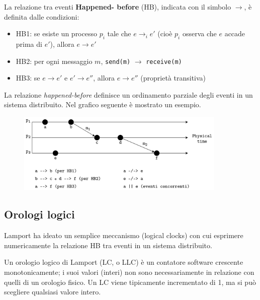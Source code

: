 \vspace{5mm}

La relazione tra eventi \textbf{Happened- before} (HB), indicata con il simbolo $\rightarrow$, è definita dalle condizioni:
\begin{itemize}
    \item HB1: se esiste un processo $ p_{i}$ tale che $e \rightarrow_{i} e'$ (cioè $p_{i}$ osserva che $e$ accade prima di $e'$), allora $e \rightarrow e'$
    \item HB2: per ogni messaggio $m$, \texttt{send(m)} $\rightarrow$ \texttt{receive(m)}
    \item HB3: se $e \rightarrow e'$ e $e' \rightarrow e''$, allora $e \rightarrow e''$ (proprietà transitiva)
\end{itemize}
La relazione \textit{happened-before} definisce un ordinamento parziale degli eventi in un sistema distribuito. Nel grafico seguente è mostrato un esempio.

\begin{figure}[hbt!]
    \centering
    \includegraphics[width=10cm]{./Images/cap3/3.3.png}
\end{figure}

\subsection{Orologi logici}
Lamport ha ideato un semplice meccanismo (logical clocks) con cui esprimere numericamente la relazione HB tra eventi in un sistema distribuito.

Un orologio logico di Lamport (LC, o LLC) è un contatore software crescente monotonicamente; i suoi valori (interi) non sono necessariamente in relazione con quelli di un orologio fisico. Un LC viene tipicamente incrementato di 1, ma si può scegliere qualsiasi valore intero. 


